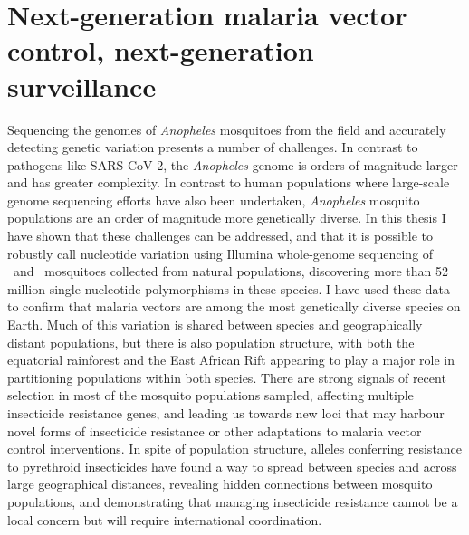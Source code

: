 \documentclass[a4paper,11pt,abstracton,hidelinks]{scrartcl}
\begin{document}
\section{Next-generation malaria vector control, next-generation surveillance}\label{sec:nextgen}


Sequencing the genomes of \textit{Anopheles} mosquitoes from the field and accurately detecting genetic variation presents a number of challenges.
%
In contrast to pathogens like SARS-CoV-2, the \textit{Anopheles} genome is orders of magnitude larger and has greater complexity.
%
In contrast to human populations where large-scale genome sequencing efforts have also been undertaken, \textit{Anopheles} mosquito populations are an order of magnitude more genetically diverse.
%
In this thesis I have shown that these challenges can be addressed, and that it is possible to robustly call nucleotide variation using Illumina whole-genome sequencing of \agam\ and \acol\ mosquitoes collected from natural populations, discovering more than 52 million single nucleotide polymorphisms in these species.
%
I have used these data to confirm that malaria vectors are among the most genetically diverse species on Earth.
%
Much of this variation is shared between species and geographically distant populations, but there is also population structure, with both the equatorial rainforest and the East African Rift appearing to play a major role in partitioning populations within both species.
%
There are strong signals of recent selection in most of the mosquito populations sampled, affecting multiple insecticide resistance genes, and leading us towards new loci that may harbour novel forms of insecticide resistance or other adaptations to malaria vector control interventions.
%
In spite of population structure, alleles conferring resistance to pyrethroid insecticides have found a way to spread between species and across large geographical distances, revealing hidden connections between mosquito populations, and demonstrating that managing insecticide resistance cannot be a local concern but will require international coordination.
\end{document}
